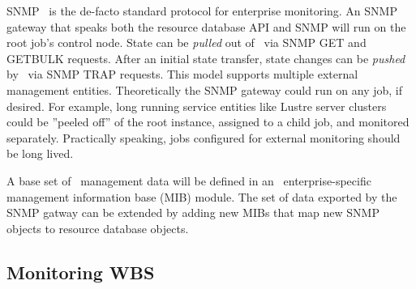 SNMP~\cite{StallingsSNMP} is the de-facto standard protocol for enterprise
monitoring.  An SNMP gateway that speaks both the resource database API
and SNMP will run on the root job's control node.
State can be {\em pulled} out of \ngrm\ via SNMP GET and GETBULK requests.
After an initial state transfer, state changes can be {\em pushed}
by \ngrm\ via SNMP TRAP requests.  This model supports multiple external
management entities.
Theoretically the SNMP gateway could run on any job, if desired.
For example, long running service entities like Lustre server clusters
could be ''peeled off'' of the root instance, assigned to a child job,
and monitored separately.
Practically speaking, jobs configured for external monitoring should be
long lived.

A base set of \ngrm\ management data will be defined in an \ngrm\ 
enterprise-specific management information base (MIB) module.
The set of data exported by the SNMP gatway can be extended by adding
new MIBs that map new SNMP objects to resource database objects.

\ifwbs
\subsection{Monitoring WBS}

